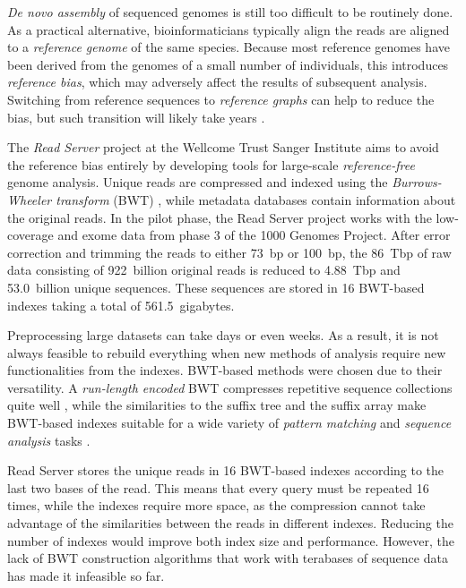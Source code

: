 \documentclass[smallabstract,smallcaptions]{dccpaper}
\newcommand{\BWT}{\textsf{BWT}}
\begin{document}
\emph{De novo assembly} of sequenced genomes is still too difficult to be routinely done. As a practical alternative, bioinformaticians typically align the reads are aligned to a \emph{reference genome} of the same species. Because most reference genomes have been derived from the genomes of a small number of individuals, this introduces \emph{reference bias}, which may adversely affect the results of subsequent analysis. Switching from reference sequences to \emph{reference graphs} can help to reduce the bias, but such transition will likely take years \cite{Church2015}.

The \emph{Read Server} project at the Wellcome Trust Sanger Institute aims to avoid the reference bias entirely by developing tools for large-scale \emph{reference-free} genome analysis. Unique reads are compressed and indexed using the \emph{Burrows-Wheeler transform} (\BWT) \cite{Burrows1994}, while metadata databases contain information about the original reads. In the pilot phase, the Read Server project works with the low-coverage and exome data from phase 3 of the 1000 Genomes Project. After error correction and trimming the reads to either 73~bp or 100~bp, the 86~Tbp of raw data consisting of 922~billion original reads is reduced to 4.88~Tbp and 53.0~billion unique sequences. These sequences are stored in 16 \BWT-based indexes \cite{Ferragina2005a} taking a total of 561.5~gigabytes.

Preprocessing large datasets can take days or even weeks. As a result, it is not always feasible to rebuild everything when new methods of analysis require new functionalities from the indexes. \BWT-based methods were chosen due to their versatility. A \emph{run-length encoded} \BWT{} compresses repetitive sequence collections quite well \cite{Maekinen2010}, while the similarities to the suffix tree and the suffix array make \BWT-based indexes suitable for a wide variety of \emph{pattern matching} and \emph{sequence analysis} tasks \cite{Ohlebusch2013,Maekinen2015}.

Read Server stores the unique reads in 16 \BWT-based indexes according to the last two bases of the read. This means that every query must be repeated 16 times, while the indexes require more space, as the compression cannot take advantage of the similarities between the reads in different indexes. Reducing the number of indexes would improve both index size and performance. However, the lack of \BWT{} construction algorithms that work with terabases of sequence data has made it infeasible so far.
\end{document}
